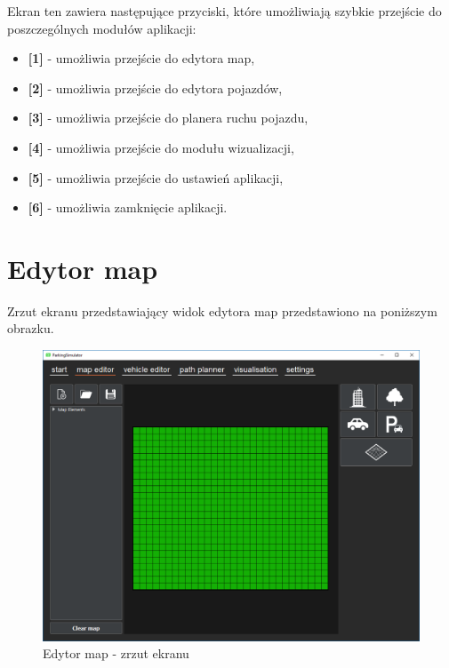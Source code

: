 \documentclass[a4paper,11pt,twoside]{report}
\theoremstyle{definition}
\begin{document}
Ekran ten zawiera następujące przyciski, które umożliwiają szybkie przejście do poszczególnych modułów aplikacji:
\begin{itemize}
	\item \textbf{[1]} - umożliwia przejście do edytora map,
	\item \textbf{[2]} - umożliwia przejście do edytora pojazdów,
	\item \textbf{[3]} - umożliwia przejście do planera ruchu pojazdu,
	\item \textbf{[4]} - umożliwia przejście do modułu wizualizacji,
	\item \textbf{[5]} - umożliwia przejście do ustawień aplikacji,
	\item \textbf{[6]} - umożliwia zamknięcie aplikacji.
\end{itemize}

\section{Edytor map}

Zrzut ekranu przedstawiający widok edytora map przedstawiono na poniższym obrazku.

\begin{figure}[h!]
\centering
\includegraphics[scale=0.5]{instructionMapEditor}
\caption[Edytor map - zrzut ekranu]{Edytor map - zrzut ekranu}
\end{figure}
\end{document}
